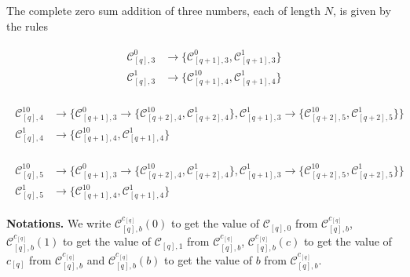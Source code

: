 \begin{definition}
   
    The complete zero sum addition of three numbers, each of length $N$, is given by the rules

    \begin{align}
        \begin{split}
            \mathcal{C}^{0}_{[q],3} &\rightarrow \{\mathcal{C}^{0}_{[q+1],3}, \mathcal{C}^{1}_{[q+1],3}\}\\
            \mathcal{C}^{1}_{[q],3} &\rightarrow \{\mathcal{C}^{10}_{[q+1],4}, \mathcal{C}^{1}_{[q+1],4}\}
        \end{split}
    \label{eq:intzerosumrulesb3}
    \end{align}

    \begin{align}
        \begin{split}
            \mathcal{C}^{10}_{[q],4} &\rightarrow \{\mathcal{C}^{0}_{[q+1],3} \rightarrow \{\mathcal{C}^{10}_{[q+2],4}, \mathcal{C}^{1}_{[q+2],4}\}, \mathcal{C}^{1}_{[q+1],3} \rightarrow \{\mathcal{C}^{10}_{[q+2],5}, \mathcal{C}^{1}_{[q+2],5}\}\}\\
            \mathcal{C}^{1}_{[q],4} &\rightarrow \{\mathcal{C}^{10}_{[q+1],4}, \mathcal{C}^{1}_{[q+1],4}\}
        \end{split}
    \label{eq:intzerosumrulesb4}
    \end{align}

    \begin{align}
         \begin{split}
            \mathcal{C}^{10}_{[q],5} &\rightarrow \{\mathcal{C}^{0}_{[q+1],3} \rightarrow \{\mathcal{C}^{10}_{[q+2],4}, \mathcal{C}^{1}_{[q+2],4}\}, \mathcal{C}^{1}_{[q+1],3} \rightarrow \{\mathcal{C}^{10}_{[q+2],5}, \mathcal{C}^{1}_{[q+2],5}\}\}\\
            \mathcal{C}^{1}_{[q],5} &\rightarrow \{\mathcal{C}^{10}_{[q+1],4}, \mathcal{C}^{1}_{[q+1],4}\}
        \end{split}
    \label{eq:inzerosumrulesb5}
    \end{align}

\label{def:zerosumbitadditionrules}
\end{definition}


\textbf{Notations.} We write $\mathcal{C}^{c_{[q]}}_{[q],b}\left(0\right)$ to get the value of $\mathcal{C}_{[q],0}$ from $\mathcal{C}^{c_{[q]}}_{[q],b}$, $\mathcal{C}^{c_{[q]}}_{[q],b}\left(1\right)$ to get the value of $\mathcal{C}_{[q],1}$ from $\mathcal{C}^{c_{[q]}}_{[q],b}$, $\mathcal{C}^{c_{[q]}}_{[q],b}\left(c\right)$ to get the value of $c_{[q]}$ from $\mathcal{C}^{c_{[q]}}_{[q],b}$ and $\mathcal{C}^{c_{[q]}}_{[q],b}\left(b\right)$ to get the value of $b$ from $\mathcal{C}^{c_{[q]}}_{[q],b}$.
